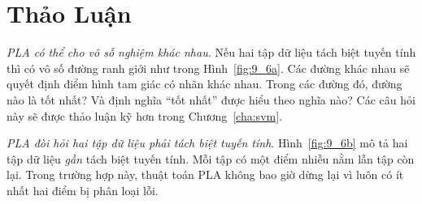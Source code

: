  
\section{Thảo Luận}
 
\textit{PLA có thể cho vô số nghiệm khác nhau.}
Nếu hai tập dữ liệu tách biệt tuyến tính thì có vô số đường ranh giới như trong Hình~\ref{fig:9_6a}. Các đường khác nhau sẽ
quyết định điểm hình tam giác có nhãn khác nhau. Trong các đường đó, đường
nào là tốt nhất? Và định nghĩa ``tốt nhất'' được hiểu theo nghĩa nào? Các câu hỏi này sẽ được thảo luận kỹ hơn trong Chương~\ref{cha:svm}.
 
 
\textit{PLA đòi hỏi hai tập dữ liệu phải tách biệt tuyến tính}. 
Hình~\ref{fig:9_6b} mô tả hai tập dữ liệu \textit{gần} tách biệt tuyến tính. Mỗi tập có một điểm {nhiễu} nằm lẫn tập còn lại. Trong trường hợp này, thuật toán PLA không bao giờ dừng lại vì luôn có ít nhất hai điểm bị phân loại lỗi. 
 

